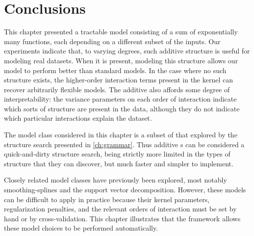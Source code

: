 \section{Conclusions}

This chapter presented a tractable \gp{} model consisting of a sum of exponentially many functions, each depending on a different subset of the inputs.
Our experiments indicate that, to varying degrees, such additive structure is useful for modeling real datasets.
When it is present, modeling this structure allows our model to perform better than standard \gp{} models.
In the case where no such structure exists, the higher-order interaction terms present in the kernel can recover arbitrarily flexible models.
The additive \gp{} also affords some degree of interpretability: the variance parameters on each order of interaction indicate which sorts of structure are present in the data, although they do not indicate which particular interactions explain the dataset.

The model class considered in this chapter is a subset of that explored by the structure search presented in \cref{ch:grammar}.
Thus additive \gp{}s can be considered a quick-and-dirty structure search, being strictly more limited in the types of structure that they can discover, but much faster and simpler to implement.

Closely related model classes have previously been explored, most notably smoothing-splines \ANOVA{} and the support vector \ANOVA{} decomposition.
However, these models can be difficult to apply in practice because their kernel parameters, regularization penalties, and the relevant orders of interaction must be set by hand or by cross-validation.
This chapter illustrates that the \gp{} framework allows these model choices to be performed automatically.


\outbpdocument{


}





